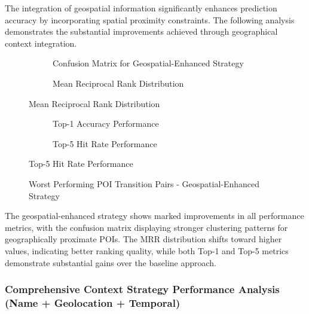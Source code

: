 \documentclass[12pt,a4paper]{article}
\begin{document}
The integration of geospatial information significantly enhances prediction accuracy by incorporating spatial proximity constraints. The following analysis demonstrates the substantial improvements achieved through geographical context integration.

\begin{figure}[h]
\centering
\begin{subfigure}{0.48\textwidth}
\centering
\caption{Confusion Matrix for Geospatial-Enhanced Strategy}
\label{fig:geospatial_confusion}
\end{subfigure}
\hfill
\begin{subfigure}{0.48\textwidth}
\centering
\caption{Mean Reciprocal Rank Distribution}
\label{fig:geospatial_mrr}
\end{subfigure}
\end{figure}

\begin{figure}[h]
\centering
\begin{subfigure}{0.48\textwidth}
\centering
\caption{Top-1 Accuracy Performance}
\label{fig:geospatial_top1}
\end{subfigure}
\hfill
\begin{subfigure}{0.48\textwidth}
\centering
\caption{Top-5 Hit Rate Performance}
\label{fig:geospatial_top5}
\end{subfigure}
\end{figure}

\begin{figure}[h]
\centering
\caption{Worst Performing POI Transition Pairs - Geospatial-Enhanced Strategy}
\label{fig:geospatial_worst_pairs}
\end{figure}

The geospatial-enhanced strategy shows marked improvements in all performance metrics, with the confusion matrix displaying stronger clustering patterns for geographically proximate POIs. The MRR distribution shifts toward higher values, indicating better ranking quality, while both Top-1 and Top-5 metrics demonstrate substantial gains over the baseline approach.

\subsubsection{Comprehensive Context Strategy Performance Analysis (Name + Geolocation + Temporal)}
\end{document}
